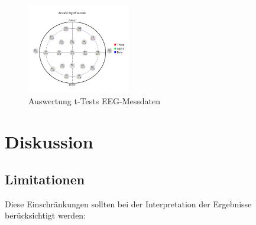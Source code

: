 \documentclass[conference]{IEEEtran}
\begin{document}
\begin{figure}[ht]
	\centering
	\includegraphics[width=0.4\textwidth]{assets/Signifikanzen.png} \hspace{-5pt}
	\caption{Auswertung t-Tests EEG-Messdaten}
	\label{fig:auswertung_t_test_eeg}
\end{figure}

\section{Diskussion}
\subsection{Limitationen}
Diese Einschränkungen sollten bei der Interpretation der Ergebnisse berücksichtigt werden:
\end{document}
